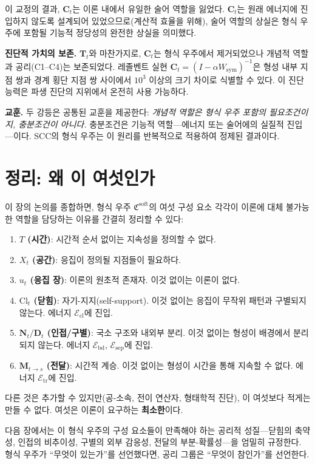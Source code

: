 이 교정의 결과, $\mathbf{C}_t$는 이론 내에서 유일한 술어 역할을 잃었다. $\mathbf{C}_t$는 원래 에너지에 진입하지 않도록 설계되어 있었으므로(계산적 효율을 위해), 술어 역할의 상실은 형식 우주에 포함될 기능적 정당성의 완전한 상실을 의미했다.

\textbf{진단적 가치의 보존.} $\mathbf{T}_t$와 마찬가지로, $\mathbf{C}_t$는 형식 우주에서 제거되었으나 개념적 역할과 공리(C1--C4)는 보존되었다. 레졸벤트 실현 $\mathbf{C}_t = (I - \alpha W_{\mathrm{sym}})^{-1}$은 형성 내부 지점 쌍과 경계 횡단 지점 쌍 사이에서 $10^3$ 이상의 크기 차이로 식별할 수 있다. 이 진단 능력은 파생 진단의 지위에서 온전히 사용 가능하다.

\textbf{교훈.} 두 강등은 공통된 교훈을 제공한다: \emph{개념적 역할은 형식 우주 포함의 필요조건이지, 충분조건이 아니다.} 충분조건은 기능적 역할---에너지 또는 술어에의 실질적 진입---이다. SCC의 형식 우주는 이 원리를 반복적으로 적용하여 정제된 결과이다.


\section{정리: 왜 이 여섯인가}
\label{sec:summary-why-six}

이 장의 논의를 종합하면, 형식 우주 $\mathfrak{C}^{\mathrm{soft}}$의 여섯 구성 요소 각각이 이론에 대체 불가능한 역할을 담당하는 이유를 간결히 정리할 수 있다:

\begin{enumerate}
    \item \textbf{$T$ (시간)}: 시간적 순서 없이는 지속성을 정의할 수 없다.
    \item \textbf{$X_t$ (공간)}: 응집이 정의될 지점들이 필요하다.
    \item \textbf{$u_t$ (응집 장)}: 이론의 원초적 존재자. 이것 없이는 이론이 없다.
    \item \textbf{$\mathrm{Cl}_t$ (닫힘)}: 자기-지지(self-support). 이것 없이는 응집이 무작위 패턴과 구별되지 않는다. 에너지 $\mathcal{E}_{\mathrm{cl}}$에 진입.
    \item \textbf{$\mathbf{N}_t / \mathbf{D}_t$ (인접/구별)}: 국소 구조와 내외부 분리. 이것 없이는 형성이 배경에서 분리되지 않는다. 에너지 $\mathcal{E}_{\mathrm{bd}}$, $\mathcal{E}_{\mathrm{sep}}$에 진입.
    \item \textbf{$\mathbf{M}_{t \to s}$ (전달)}: 시간적 계승. 이것 없이는 형성이 시간을 통해 지속할 수 없다. 에너지 $\mathcal{E}_{\mathrm{tr}}$에 진입.
\end{enumerate}

다른 것은 추가할 수 있지만(공-소속, 전이 연산자, 형태학적 진단), 이 여섯보다 적게는 만들 수 없다. 여섯은 이론이 요구하는 \textbf{최소한}이다.

\bigskip

다음 장에서는 이 형식 우주의 구성 요소들이 만족해야 하는 공리적 성질---닫힘의 축약성, 인접의 비추이성, 구별의 외부 감응성, 전달의 부분-확률성---을 엄밀히 규정한다. 형식 우주가 ``무엇이 있는가''를 선언했다면, 공리 그룹은 ``무엇이 참인가''를 선언한다.
